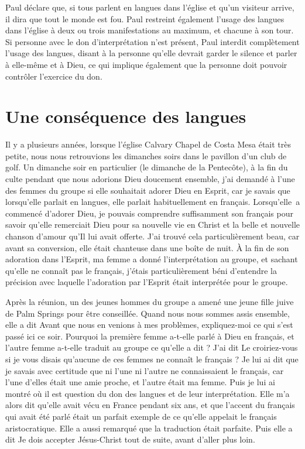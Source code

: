 Paul déclare que, si tous parlent en langues dans l'église et qu'un visiteur
 arrive, il dira que tout le monde est fou.
 Paul restreint également l'usage des langues dans l'église à deux ou trois
 manifestations au maximum, et chacune à son tour.
 Si personne avec le don d'interprétation n'est présent, Paul interdit
 complètement l'usage des langues, disant à la personne qu'elle devrait
 garder le silence et parler à elle-même et à Dieu,
 ce qui implique également que la personne doit pouvoir contrôler
 l'exercice du don.


\section{Une cons\'equence des langues}

Il y a plusieurs années, lorsque l'église Calvary Chapel de Costa Mesa était
 très petite, nous nous retrouvions les dimanches soirs dans le pavillon
 d'un club de golf. Un dimanche soir en particulier (le dimanche
 de la Pentecôte), à la fin du culte pendant que nous adorions Dieu
 doucement ensemble, j'ai demandé à l'une des femmes du groupe si elle
 souhaitait adorer Dieu en Esprit, car je savais que lorsqu'elle parlait
 en langues, elle parlait habituellement en français.
 Lorsqu'elle~a commencé d'adorer Dieu, je pouvais comprendre suffisamment
 son français pour savoir qu'elle remerciait Dieu pour sa nouvelle vie
 en Christ et la belle et nouvelle chanson d'amour qu'Il lui avait offerte.
 J'ai trouvé cela particulièrement beau, car avant sa conversion, elle était chanteuse dans une boîte
 de nuit. À la fin de son adoration dans l'Esprit,
 ma femme a donné l'interprétation au groupe, et sachant
 qu'elle ne connaît pas le français, j'étais particulièrement béni
 d'entendre la précision avec laquelle l'adoration par l'Esprit
 était interprétée pour le groupe.

Après la réunion, un des jeunes hommes du groupe a amené une jeune fille
 juive de Palm Springs pour être conseillée. Quand nous nous sommes
 assis ensemble, elle a dit\frcolon{} \Og Avant que nous en venions à mes problèmes,
 expliquez-moi ce qui s'est passé ici ce soir. Pourquoi la première
 femme a-t-elle parlé à Dieu en français, et l'autre femme a-t-elle
 traduit au groupe ce qu'elle a dit ? \Fg{}
 J'ai dit\frcolon{} \Og Le croiriez-vous si je vous disais qu'aucune de ces femmes
 ne connaît le français ? \Fg{} Je lui ai dit que je savais avec certitude
 que ni l'une ni l'autre ne connaissaient le français, car l'une d'elles
 était une amie proche, et l'autre était ma femme. Puis je lui ai montré
  où il est question du don des langues
 et de leur in\-ter\-pré\-ta\-tion. Elle m'a alors dit qu'elle avait vécu en France
 pendant six ans, et que l'accent du français qui avait été parlé était
 un parfait exemple de ce qu'elle appelait le français aristocratique.
 Elle a aussi remarqué que la traduction était parfaite.
 Puis elle a dit\frcolon{} \Og Je dois accepter Jésus-Christ tout de suite,
 avant d'aller plus loin. \Fg{}

